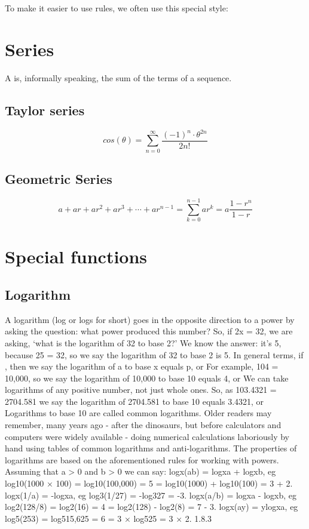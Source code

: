 To make it easier to use rules, we often use this special style:

\section{Series}
A  is, informally speaking, the sum of the terms of a sequence.

\subsection{Taylor series}
\begin{equation}
cos(\theta) = \sum_{n=0}^{\infty} \frac{(-1)^n \cdot \theta^{2n}}{2n!}
\end{equation}

\subsection{Geometric Series}
\begin{equation}
a + ar + ar^2 + ar^3 + \cdots + ar^{n-1} = \sum_{k=0}^{n-1}ar^k = a \frac{1-r^n}{1-r}
\end{equation}



\section{Special functions}
\subsection{Logarithm}
A logarithm (log or logs for short) goes in the opposite direction to a power by asking the question: what power produced this number? So, if 2x = 32, we are asking, ‘what is the logarithm of 32 to base 2?’ We know the answer: it's 5, because 25 = 32, so we say the logarithm of 32 to base 2 is 5. In general terms, if , then we say the logarithm of a to base x equals p, or For example, 104 = 10,000, so we say the logarithm of 10,000 to base 10 equals 4, or We can take logarithms of any positive number, not just whole ones. So, as 103.4321 = 2704.581 we say the logarithm of 2704.581 to base 10 equals 3.4321, or Logarithms to base 10 are called common logarithms. Older readers may remember, many years ago - after the dinosaurs, but before calculators and computers were widely available - doing numerical calculations laboriously by hand using tables of common logarithms and anti-logarithms. The properties of logarithms are based on the aforementioned rules for working with powers. Assuming that a > 0 and b > 0 we can say: logx(ab) = logxa + logxb, eg log10(1000 × 100) = log10(100,000) = 5 = log10(1000) + log10(100) = 3 + 2. logx(1/a) = -logxa, eg log3(1/27) = -log327 = -3. logx(a/b) = logxa - logxb, eg log2(128/8) = log2(16) = 4 = log2(128) - log2(8) = 7 - 3. logx(ay) = ylogxa, eg log5(253) = log515,625 = 6 = 3 × log525 = 3 × 2. 1.8.3

